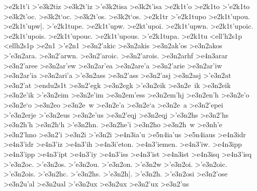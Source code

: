 {>e2k1t'i
	>'e3k2tiz		%
	>e3k2t'iz
	>'e3k2tisa		%
	>e3k2t'isa
>e2k1t'o
>e2k1to
>'e2k1to
	>e3k2t'oc.		%
	>e3k2t`oc.
	>e3k2t'os.
	>e3k2t`os.
>e2k1tr
>'e2k1tupo  		%
>e2k1t'upou.
>e2k1t'upw|.
>'e2k1tupe.
>e2k1t'upw.
>e2kt'upoi.
>e2k1t'upwn.
>e2k1t'upoic.
>e2k1t'upois.
>e2k1t'upouc.
>e2k1t'upous.
>'e2k1tupa.
>e2k1tu
<ell'h2s1p 		%
<ellh2s1p
>e2n1
>'e2n1
	>e3n2'akic 		%
	>e3n2akis  		%
	>e3n2ak'os 		%
	>e3n2akos
	>'e3n2ara.   		%
	>e3n2'arwn.
	>e3n2'aroic.
	>e3n2'arois.
	>e3n2arhf   		%
		>e4n3arar 		%
	>e3n2'aree  		%
	>e3n2ar'ew
	>e3n2ar'ea  		%
	>e3n2are'a
	>e3n2'arie  		%
	>e3n2ar'iw
	>e3n2ar'ia  		%
	>e3n2ari'a
	>'e3n2ass  		%
	>e3n2'ass
	>e3n2'asj
	>e3n2asj
	>'e3n2at   		%
	>e3n2'at
>endu2s1t   		%
	>e3n2'egk   		%
	>e3n2egk    		%
	>'e3n2eik   		%
	>e3n2e~ik   		%
	>e3n2eik    		%
	>e3n2e'ik   		%
	>'e3n2eim   		%
	>e3n2e'im
	>e3n2em'ess 		%
	>e3n2em'hj  		%
	>e3n2en'h   		%
	>e3n2e'o    		%
	>e3n2e`o
	>e3n2eo
	>e3n2e~w
	>e3n2e'a
	>e3n2e`a
	>e3n2e~a
	>e3n2'epei
	>'e3n2erje  		%
	>'e3n2eus   		%
	>e3n2e'us   		%
	>e3n2'eqj   		%
	>e3n2eqj
	>'e3n2hs		%
	>e3n2'hs
	>e3n2h'h		%
	>e3n2h`h
	>'e3n2hn.		%
	>e3n2he'i  		%
	>e3n2ho
	>e3n2h~w
	>e3nh'e
	>e3n2'hno   		%
	>e3n2'i
	>e3n2i
	>'e3n2i
		>e4n3ia'u  		%
			>e5n4ia'us  		%
			>e5n4iaus
		>e4n3idr    		%
		>e4n3'idr		%
		>e4n3'iz   		%
		>e4n3'ih   		%
		>e4n3i'eton.
		>e4n3'iemen.
		>e4n3'iw.
		>e4n3ipp   		%
		>e4n3'ipp  		%
		>e4n3'ipt  		%
		>e4n3'iy
		>e4n3'iss  		%
		>e4n3'ist  		%
		>e4n3ist
		>e4n3isq   		%
		>e4n3'isq  		%
	>'e3n2oc.		%
	>'e3n2os.
	>'e3n2ou.
	>'e3n2on.
	>'e3n2w
	>'e3n2oi.
	>'e3n2oic.
	>'e3n2ois.
	>'e3n2hc.
	>'e3n2hs.
	>'e3n2h|.
 	>'e3n2h.
	>'e3n2osi		%
	>e3n2'ose
	>e3n2u'al  		%
	>e3n2ual
	>'e3n2ux    		%
	>e3n2ux 		%
	>e3n2'ux		%
	>e3n2'us    		%
}
